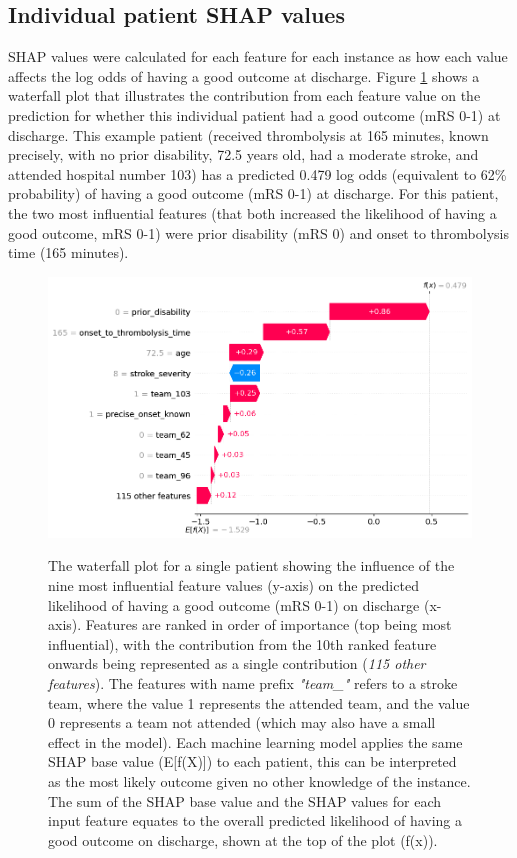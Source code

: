 \subsection{Individual patient SHAP values}

SHAP values were calculated for each feature for each instance as how each value affects the log odds of having a good outcome at discharge. Figure \ref{fig:single_waterfall_with_ivt} shows a waterfall plot that illustrates the contribution from each feature value on the prediction for whether this individual patient had a good outcome (mRS 0-1) at discharge. This example patient (received thrombolysis at 165 minutes, known precisely, with no prior disability, 72.5 years old, had a moderate stroke, and attended hospital number 103) has a predicted 0.479 log odds (equivalent to 62\% probability) of having a good outcome (mRS 0-1) at discharge. For this patient, the two most influential features (that both increased the likelihood of having a good outcome, mRS 0-1) were prior disability (mRS 0) and onset to thrombolysis time (165 minutes).

\begin{figure}[!h]
    \centering%
      \includegraphics[width=0.95\linewidth]{./images/103_xgb_7_features_1fold_binary_waterfall_plot_patient16_with_IVT.png}\\
  \caption{The waterfall plot for a single patient showing the influence of the nine most influential feature values (y-axis) on the predicted likelihood of having a good outcome (mRS 0-1) on discharge (x-axis). Features are ranked in order of importance (top being most influential), with the contribution from the 10th ranked feature onwards being represented as a single contribution (\textit{115 other features}). The features with name prefix \textit{"team\_"} refers to a stroke team, where the value 1 represents the attended team, and the value 0 represents a team not attended (which may also have a small effect in the model). Each machine learning model applies the same SHAP base value (E[f(X)]) to each patient, this can be interpreted as the most likely outcome given no other knowledge of the instance. The sum of the SHAP base value and the SHAP values for each input feature equates to the overall predicted likelihood of having a good outcome on discharge, shown at the top of the plot (f(x)).}
    \label{fig:single_waterfall_with_ivt}
\end{figure}

